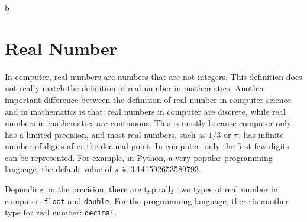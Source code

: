 b\documentclass[../main.tex]{subfiles}
\begin{document}
    \section{Real Number}
    In computer, real numbers are numbers that are not integers. This definition
    does not really match the definition of real number in mathematics. Another
    important difference between the definition of real number in computer science
    and in mathematics is that: real numbers in computer are discrete, while real
    numbers in mathematics are continuous. This is mostly because computer only
    has a limited precision, and most real numbers, such as \(1/3\) or $\pi$, has
    infinite number of digits after the decimal point. In computer, only the first
    few digits can be represented. For example, in Python, a very popular
    programming language, the default value of $\pi$ is 3.141592653589793.

    Depending on the precision, there are typically two types of real number in
    computer: \texttt{float} and \texttt{double}. For the \csharp programming
    language, there is another type for real number: \texttt{decimal}.
\end{document}
